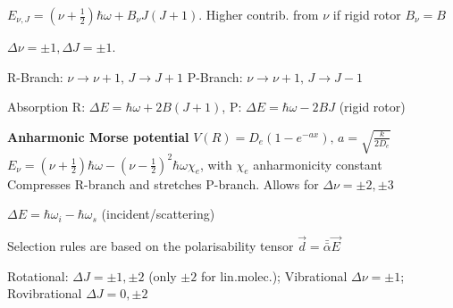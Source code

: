 \begin{squishlist}
    \item $E_{\nu, J} = (\nu + \frac{1}{2}) \hbar \omega + B_{\nu} J(J+1)$. Higher contrib. from $\nu$ \squishsep if rigid rotor $B_{\nu} = B$
    \item $\Delta \nu = \pm 1, \Delta J = \pm 1$.
    \item R-Branch: $\nu \rightarrow \nu + 1,\, J \rightarrow J+1$ \quad P-Branch:  $\nu \rightarrow \nu + 1, \,  J \rightarrow J-1$
    \item Absorption \quad R: $\Delta E = \hbar \omega + 2B(J+1)$, P: $\Delta E = \hbar \omega - 2BJ$ (rigid rotor)
    \item \textbf{Anharmonic Morse potential} $V(R) = D_e (1 - e^{-ax}), \, a = \sqrt{\frac{k}{2D_e}}$ \\
    $E_{\nu} = (\nu+\frac{1}{2}) \hbar \omega - (\nu - \frac{1}{2})^2 \hbar \omega \chi_e$, with $\chi_e$ anharmonicity constant \\
    Compresses R-branch and stretches P-branch. Allows for $\Delta \nu = \pm 2, \pm 3$
\end{squishlist}

\begin{squishlist}
    \item $\Delta E = \hbar \omega_i - \hbar \omega_s$ (incident/scattering)
    \item Selection rules are based on the polarisability tensor $\vec{d} = \bar{\bar{\alpha}} \vec{E}$
    \item Rotational: $\Delta J = \pm 1, \pm 2$ (only $\pm 2$ for lin.molec.); Vibrational $\Delta \nu  =\pm 1$; \\ Rovibrational $\Delta J = 0, \pm 2$
\end{squishlist}